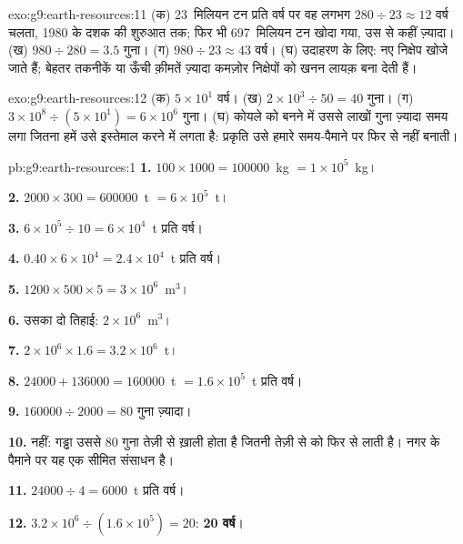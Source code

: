 \begin{solution}{exo:g9:earth-resources:11}
(क) 23~मिलियन टन प्रति वर्ष पर वह लगभग $280 \div 23
\approx 12$ वर्ष चलता,
1980 के दशक की शुरुआत तक; फिर भी 697~मिलियन टन खोदा गया, उस  से कहीं ज़्यादा।
(ख) $980 \div 280 = 3.5$ गुना। (ग) $980 \div
23 \approx 43$ वर्ष। (घ) उदाहरण के लिए: नए निक्षेप खोजे जाते हैं; बेहतर तकनीकें या ऊँची
क़ीमतें ज़्यादा कमज़ोर निक्षेपों को खनन लायक़ बना देती हैं।
\end{solution}

\begin{solution}{exo:g9:earth-resources:12}
(क) $5 \times 10^1$ वर्ष। (ख) $2 \times 10^3 \div 50 = 40$ गुना। (ग) $3
\times 10^8 \div (5 \times 10^1) = 6 \times 10^6$ गुना। (घ) कोयले को बनने में उससे
लाखों गुना ज़्यादा समय लगा जितना हमें उसे इस्तेमाल करने में लगता है: प्रकृति उसे हमारे
समय-पैमाने पर फिर से नहीं बनाती।
\end{solution}

\begin{solution}{pb:g9:earth-resources:1}
\textbf{1.} $100 \times 1000 = \num{100000}$~kg $= 1 \times 10^5$~kg।

\textbf{2.} $2000 \times 300 = \num{600000}$~t $= 6 \times 10^5$~t।

\textbf{3.} $6 \times 10^5 \div 10 = 6 \times 10^4$~t प्रति वर्ष।

\textbf{4.} $0.40 \times 6 \times 10^4 = 2.4 \times 10^4$~t  प्रति
वर्ष।

\textbf{5.} $1200 \times 500 \times 5 = 3 \times 10^6$~m$^3$।

\textbf{6.} उसका दो तिहाई: $2 \times 10^6$~m$^3$।

\textbf{7.} $2 \times 10^6 \times 1.6 = 3.2 \times 10^6$~t।

\textbf{8.} $\num{24000} + \num{136000} = \num{160000}$~t $= 1.6 \times
10^5$~t प्रति वर्ष।

\textbf{9.} $\num{160000} \div 2000 = 80$ गुना ज़्यादा।

\textbf{10.} नहीं: गड्ढा उससे 80 गुना तेज़ी से ख़ाली होता है जितनी तेज़ी से   को फिर से
लाती है। नगर के पैमाने पर यह  एक सीमित संसाधन है।

\textbf{11.} $\num{24000} \div 4 = \num{6000}$~t  प्रति वर्ष।

\textbf{12.} $3.2 \times 10^6 \div (1.6 \times 10^5) = 20$: \textbf{20 वर्ष}।
\end{solution}
